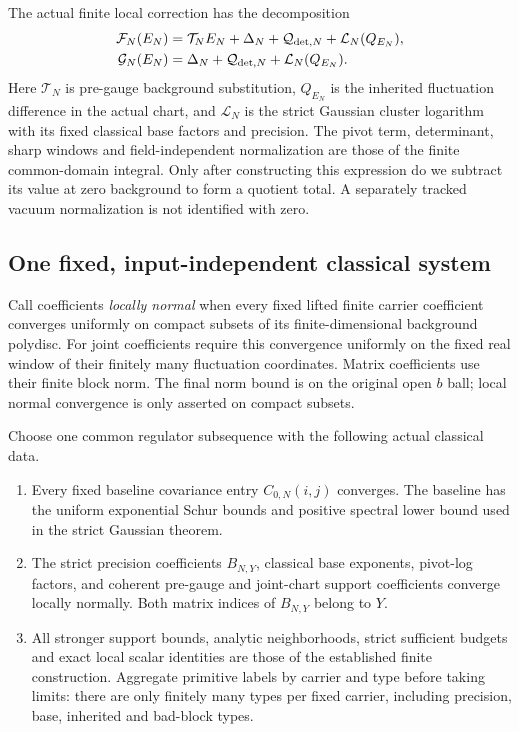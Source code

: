 \documentclass[11pt]{article}
\theoremstyle{remark}
\begin{document}
The actual finite local correction has the decomposition
\begin{align}
 \mathcal F_N(E_N)
   &=\mathcal T_NE_N+\Delta_N+\mathcal Q_{{\rm det},N}
                         +\mathcal L_N(Q_{E_N}),\notag\\
 \mathcal G_N(E_N)
   &=\Delta_N+\mathcal Q_{{\rm det},N}
                         +\mathcal L_N(Q_{E_N}).
 \label{qll-finite-map}
\end{align}
Here \(\mathcal T_N\) is pre-gauge background substitution,
\(Q_{E_N}\) is the inherited fluctuation difference in the
actual chart, and \(\mathcal L_N\) is the strict Gaussian
cluster logarithm with its fixed classical base factors and
precision. The pivot term, determinant, sharp windows and
field-independent normalization are those of the finite
common-domain integral. Only after constructing this expression
do we subtract its value at zero background to form a quotient
total. A separately tracked vacuum normalization is not
identified with zero.

\subsection{One fixed, input-independent classical system}
\label{qll-data-section}

Call coefficients \emph{locally normal} when every fixed lifted
finite carrier coefficient converges uniformly on compact
subsets of its finite-dimensional background polydisc.
For joint coefficients require this convergence uniformly on
the fixed real window of their finitely many fluctuation
coordinates. Matrix coefficients use their finite block norm.
The final norm bound is on the original open \(b\) ball;
local normal convergence is only asserted on compact subsets.

Choose one common regulator subsequence with the following
actual classical data.

\begin{enumerate}
\item Every fixed baseline covariance entry \(C_{0,N}(i,j)\)
converges. The baseline has the uniform exponential Schur
bounds and positive spectral lower bound used in the strict
Gaussian theorem.
\item The strict precision coefficients \(B_{N,Y}\), classical
base exponents, pivot-log factors, and coherent pre-gauge
and joint-chart support coefficients converge locally normally.
Both matrix indices of \(B_{N,Y}\) belong to \(Y\).
\item All stronger support bounds, analytic neighborhoods,
strict sufficient budgets and exact local scalar identities
are those of the established finite construction. Aggregate
primitive labels by carrier and type before taking limits:
there are only finitely many types per fixed carrier, including
precision, base, inherited and bad-block types.
\end{enumerate}
\end{document}
